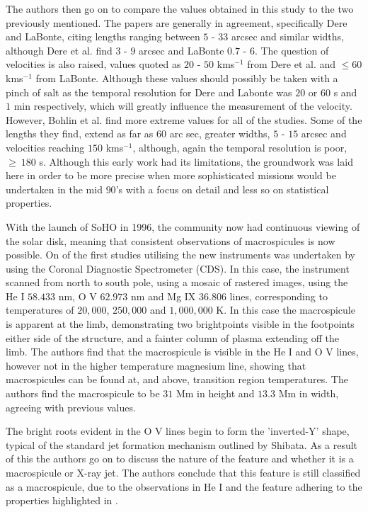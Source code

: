 The authors then go on to compare the values obtained in this study to the two previously mentioned. The papers are generally in agreement, specifically Dere and LaBonte, citing lengths ranging between $5$ - $33$ arcsec and similar widths, although Dere et al. find $3$ - $9$ arcsec and LaBonte $0.7$ - $6$.
The question of velocities is also raised, values quoted as $20$ - $50$ kms${^{-1}}$ from Dere et al. and $\leq60$ kms${^{-1}}$ from LaBonte.
Although these values should possibly be taken with a pinch of salt as the temporal resolution for Dere and Labonte was $20$ or $60$ s and $1$ min respectively, which will greatly influence the measurement of the velocity.
However, Bohlin et al. find more extreme values for all of the studies.
Some of the lengths they find, extend as far as $60$ arc sec, greater widths, $5$ - $15$ arcsec and velocities reaching $150$ kms${^{-1}}$, although, again the temporal resolution is poor, $\geq~180$ s.
Although this early work had its limitations, the groundwork was laid here in order to be more precise when more sophisticated missions would be undertaken in the mid $90$'s with a focus on detail and less so on statistical properties.

With the launch of SoHO in 1996, the community now had continuous viewing of the solar disk, meaning that consistent observations of macrospicules is now possible.
On of the first studies utilising the new instruments was undertaken by \cite{Pike1997} using the Coronal Diagnostic Spectrometer (CDS).
In this case, the instrument scanned from north to south pole, using a mosaic of rastered images, using the He I $58.433$ nm, O V $62.973$ nm and Mg IX $36.806$ lines, corresponding to temperatures of $20,000$, $250,000$ and $1,000,000$ K.
In this case the macrospicule is apparent at the limb, demonstrating two brightpoints visible in the footpoints either side of the structure, and a fainter column of plasma extending off the limb.
The authors find that the macrospicule is visible in the He I and O V lines, however not in the higher temperature magnesium line, showing that macrospicules can be found at, and above, transition region temperatures.
The authors find the macrospicule to be $31$ Mm in height and $13.3$ Mm in width, agreeing with previous values.

The bright roots evident in the O V lines begin to form the 'inverted-Y' shape, typical of the standard jet formation mechanism outlined by Shibata.
As a result of this the authors go on to discuss the nature of the feature and whether it is a macrospicule or X-ray jet.
The authors conclude that this feature is still classified as a macrospicule, due to the observations in He I and the feature adhering to the properties highlighted in \cite{Bohlin1976}.

